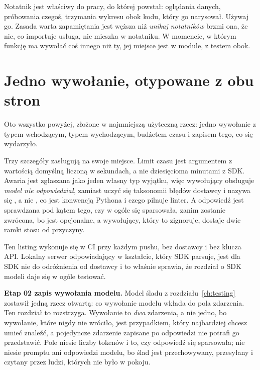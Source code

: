 Notatnik jest właściwy do pracy, do której powstał: oglądania danych,
próbowania czegoś, trzymania wykresu obok kodu, który go narysował. Używaj
go. Zasada warta zapamiętania jest węższa niż \emph{unikaj notatników}
\dash{} brzmi ona, że nic, co importuje usługa, nie mieszka w notatniku. W
momencie, w którym funkcję ma wywołać coś innego niż ty, jej miejsce jest w
module, z testem obok.

\section{Jedno wywołanie, otypowane z obu stron}
\label{sec:ai-call-model}

Oto wszystko powyżej, złożone w najmniejszą użyteczną rzecz: jedno wywołanie
z typem wchodzącym, typem wychodzącym, budżetem czasu i zapisem tego, co się
wydarzyło.



Trzy szczegóły zasługują na swoje miejsce. Limit czasu jest argumentem z
wartością domyślną liczoną w sekundach, a nie dziesięcioma minutami z SDK.
Awaria jest zgłaszana jako jeden własny typ wyjątku, więc wywołujący obsługuje
\emph{model nie odpowiedział}, zamiast uczyć się taksonomii błędów dostawcy
\dash{} i nazywa się , a nie , co jest
konwencją Pythona i czego pilnuje linter. A odpowiedź jest sprawdzana pod
kątem tego, czy w ogóle się sparsowała, zanim zostanie zwrócona, bo
 jest opcjonalne, a wywołujący, który to zignoruje,
dostaje  dwie ramki stosu od przyczyny.


Ten listing wykonuje się w CI przy każdym pushu, bez dostawcy i bez klucza
API. Lokalny serwer odpowiadający w kształcie, który SDK parsuje, jest dla
SDK nie do odróżnienia od dostawcy \dash{} i to właśnie sprawia, że rozdział
o SDK modeli daje się w ogóle testować.

\begin{projectbox}
\textbf{Etap 02 \dash{} zapis wywołania modelu.} Model śladu z
rozdziału~\ref{ch:testing} zostawił jedną rzecz otwartą: co wywołanie modelu
wkłada do pola  zdarzenia. Ten rozdział to rozstrzyga. Wywołanie
to \emph{dwa} zdarzenia, a nie jedno, bo wywołanie, które nigdy nie wróciło,
jest przypadkiem, który najbardziej chcesz umieć znaleźć, a pojedyncze
zdarzenie zapisane po odpowiedzi nie potrafi go przedstawić. Pole
 niesie liczby tokenów i to, czy odpowiedź się sparsowała; nie
niesie promptu ani odpowiedzi modelu, bo ślad jest przechowywany, przesyłany
i czytany przez ludzi, których nie było w pokoju.
\end{projectbox}

